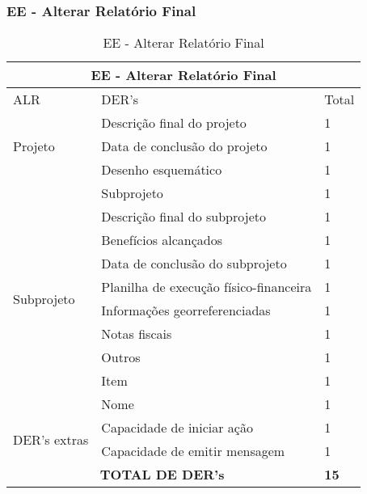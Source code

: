   \subsubsection{EE - Alterar Relatório Final}
  \begin{table}[!h]
\centering
\caption{EE - Alterar Relatório Final}
\label{ee_alterar_relatorio_final}
\begin{tabular}{|l|l|l|}
\hline
\multicolumn{3}{|c|}{EE - Alterar Relatório Final}                                                                 \\ \hline
ALR                           & DER's                                                & Total              \\ \hline
\multirow{3}{*}{Projeto}     & Descrição final do projeto             & 1 \\ \cline{2-3}
                             & Data de conclusão do projeto           & 1 \\ \cline{2-3}
                             & Desenho esquemático                    & 1 \\ \cline{2-3} \hline
\multirow{10}{*}{Subprojeto} & Subprojeto                             & 1 \\ \cline{2-3}
                             & Descrição final do subprojeto          & 1 \\ \cline{2-3}
                             & Benefícios alcançados                  & 1 \\ \cline{2-3}
                             & Data de conclusão do subprojeto        & 1 \\ \cline{2-3}
                             & Planilha de execução físico-financeira & 1 \\ \cline{2-3}
                             & Informações georreferenciadas          & 1 \\ \cline{2-3}
                             & Notas fiscais                          & 1 \\ \cline{2-3}
                             & Outros                                 & 1 \\ \cline{2-3}
                             & Item                                   & 1 \\ \cline{2-3}
                             & Nome                                   & 1 \\ \cline{2-3} \hline
\multirow{2}{*}{DER's extras} & Capacidade de iniciar ação             & 1 \\ \cline{2-3}
                 & Capacidade de emitir mensagem& 1 \\ \hline
\multicolumn{2}{|c|}{\textbf{TOTAL DE DER's}}                                                 & \textbf{15}                 \\ \hline
\end{tabular}
\end{table}


